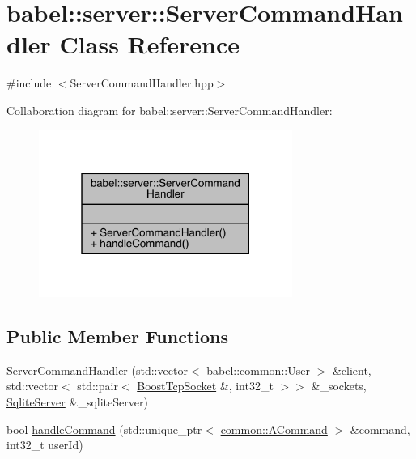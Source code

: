 \hypertarget{classbabel_1_1server_1_1_server_command_handler}{}\section{babel\+:\+:server\+:\+:Server\+Command\+Handler Class Reference}
\label{classbabel_1_1server_1_1_server_command_handler}


{\ttfamily \#include $<$Server\+Command\+Handler.\+hpp$>$}



Collaboration diagram for babel\+:\+:server\+:\+:Server\+Command\+Handler\+:\nopagebreak
\begin{figure}[H]
\begin{center}
\leavevmode
\includegraphics[width=235pt]{classbabel_1_1server_1_1_server_command_handler__coll__graph}
\end{center}
\end{figure}
\subsection*{Public Member Functions}
\begin{DoxyCompactItemize}
\item 
\mbox{\hyperlink{classbabel_1_1server_1_1_server_command_handler_aa5d9383dcd2e9a38263e3b11722a2f4a}{Server\+Command\+Handler}} (std\+::vector$<$ \mbox{\hyperlink{classbabel_1_1common_1_1_user}{babel\+::common\+::\+User}} $>$ \&client, std\+::vector$<$ std\+::pair$<$ \mbox{\hyperlink{classbabel_1_1server_1_1_boost_tcp_socket}{Boost\+Tcp\+Socket}} \&, int32\+\_\+t $>$$>$ \&\+\_\+sockets, \mbox{\hyperlink{classbabel_1_1server_1_1_sqlite_server}{Sqlite\+Server}} \&\+\_\+sqlite\+Server)
\item 
bool \mbox{\hyperlink{classbabel_1_1server_1_1_server_command_handler_ad6e3e8c0c7e708fae3a82553e34c6d0d}{handle\+Command}} (std\+::unique\+\_\+ptr$<$ \mbox{\hyperlink{classbabel_1_1common_1_1_a_command}{common\+::\+A\+Command}} $>$ \&command, int32\+\_\+t user\+Id)
\end{DoxyCompactItemize}


